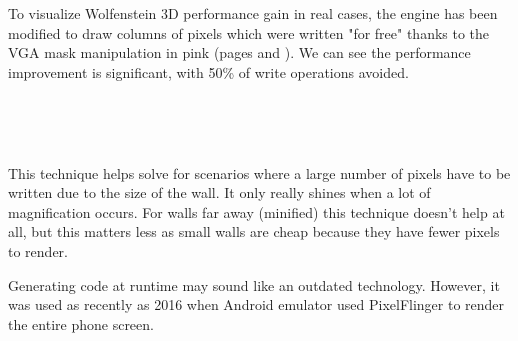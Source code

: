 To visualize Wolfenstein 3D performance gain in real cases, the engine has been modified to draw columns of pixels which were written "for free" thanks to the VGA mask manipulation in pink (pages \pageref{wolf3d_in_pink} and \pageref{wolf3d_in_pink2}). We can see the performance improvement is significant, with 50\% of write operations avoided.

\begin{minipage}{\textwidth}
 \centering
  \label{wolf3d_in_pink}
\vspace*{0.3cm}\\

\end{minipage}


\par

\begin{minipage}{\textwidth}
 \centering
  \label{wolf3d_in_pink2}
 \vspace*{0.3cm}\\
\end{minipage}
This technique helps solve for scenarios where a large number of pixels have to be written due to the size of the wall. It only really shines when a lot of magnification occurs. For walls far away (minified) this technique doesn't help at all, but this matters less as small walls are cheap because they have fewer pixels
to render.\\
\par
{} Generating code at runtime may sound like an outdated technology. However, it was used as recently as 2016 when Android emulator used PixelFlinger to render the entire phone screen.

\vspace{10pt}



















